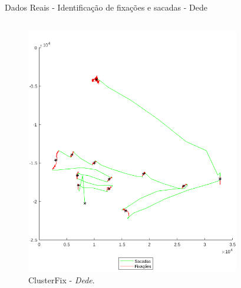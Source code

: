 \documentclass[10pt]{beamer}
\begin{document}
\begin{frame}{Dados Reais - Identificação de fixações e sacadas -  Dede}
    \begin{columns}
        \begin{column}{0.48\textwidth}
            \begin{figure}[H]
                \begin{center}
                    \includegraphics[scale=0.25]{imagens/dede_clusterfix.png}
                    \caption{ClusterFix - \textit{Dede}.}
                \end{center}
            \end{figure}
        \end{column}
        \begin{column}{0.48\textwidth}
            \begin{figure}[H]
                \begin{center}

\end{center}
\end{figure}
\end{column}
\end{columns}
\end{frame}
\end{document}
